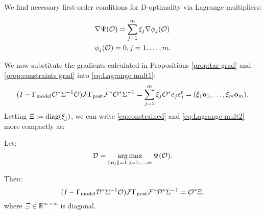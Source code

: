 



We find necessary first-order conditions for D-optimality via Lagrange
multipliers:

\begin{align}
  &\nabla \tar(\obs) = \sum_{j=1}^m \xi_j \nabla \phi_j (\obs)
  \label{eq:Lagrange mult1} \\
    &\phi_j(\obs) = 0, j = 1,\dots,m. \label{eq:Lagrange mult2}
\end{align}

We now substitute the gradients calculated in Propositions
\ref{prop:tar grad} and \ref{prop:constraints grad} into
\eqref{eq:Lagrange mult1}:
\begin{equation}\label{eq:constrained}
  (I - \modcov \obs^* \Sigma^{-1} \obs) \fwd \postcov \fwd^* \obs^*\Sigma^{-1}
  = \sum_{j=1}^m \xi_j \obs^* e_je_j^t = (\xi_1 \meas_1,\dots,\xi_m \meas_m).
\end{equation} 
Letting $\Xi := \textup{diag}(\xi_j)$, we can write \eqref{eq:constrained} and
\eqref{eq:Lagrange mult2} more compactly as:

\begin{theorem}\label{thm:constrained}
  Let:
  \begin{equation*}
    \opt = \argmax_{\|\meas_j\| = 1, j=1,\dots,m}\tar(\obs).
  \end{equation*}
  
  Then:
  \begin{equation*}
    ( I - \modcov \opt^* \Sigma^{-1} \obs) \fwd \postcov \fwd^* \opt^*  \Sigma^{-1}
    = \obs^* \Xi, 
  \end{equation*}
  where $\Xi \in \mathbb{R}^{m \times m}$ is diagonal.
\end{theorem}




